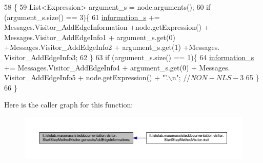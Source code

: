 \begin{DoxyCode}
58                                                                     \{
59         List<Expression> argument\_s = node.arguments();
60         \textcolor{keywordflow}{if} (argument\_s.size() == 3)\{
61             \hyperlink{classit_1_1isislab_1_1masonassisteddocumentation_1_1visitor_1_1_code_visitor_a628ab846d2f4de647f171060ebe73774}{information\_s} += Messages.Visitor\_AddEdgeInformation +node.getExpression() +
      Messages.Visitor\_AddEdgeInfo1 + argument\_s.get(0) +Messages.Visitor\_AddEdgeInfo2 + argument\_s.get(1) +Messages.
      Visitor\_AddEdgeInfo3;
62         \}
63         \textcolor{keywordflow}{if} (argument\_s.size() == 1)\{
64             \hyperlink{classit_1_1isislab_1_1masonassisteddocumentation_1_1visitor_1_1_code_visitor_a628ab846d2f4de647f171060ebe73774}{information\_s} += Messages.Visitor\_AddEdgeInfo4 + argument\_s.get(0) + Messages.
      Visitor\_AddEdgeInfo5 + node.getExpression() + \textcolor{stringliteral}{"'.\(\backslash\)n"}; \textcolor{comment}{//$NON-NLS-3$}
65         \}
66     \}
\end{DoxyCode}


Here is the caller graph for this function\-:\nopagebreak
\begin{figure}[H]
\begin{center}
\leavevmode
\includegraphics[width=350pt]{classit_1_1isislab_1_1masonassisteddocumentation_1_1visitor_1_1_start_step_method_visitor_a11cd1a31034690b4967546ff9250ead6_icgraph}
\end{center}
\end{figure}


